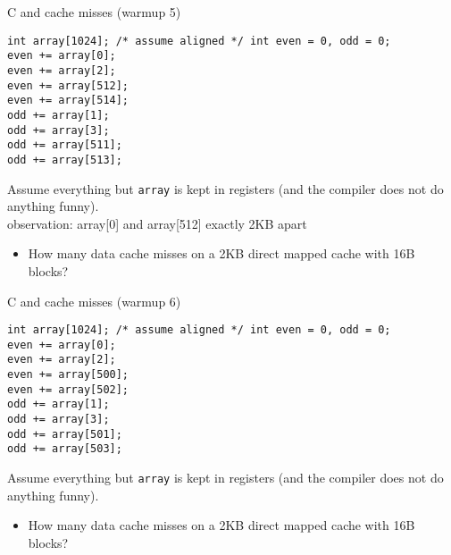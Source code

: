 \begin{frame}[fragile,label=arrayMissesWarmup5]{C and cache misses (warmup 5)}
\begin{lstlisting}[style=smaller]
int array[1024]; /* assume aligned */ int even = 0, odd = 0;
even += array[0];
even += array[2];
even += array[512];
even += array[514];
odd += array[1];
odd += array[3];
odd += array[511];
odd += array[513];
\end{lstlisting}
{\small
Assume everything but {\tt array} is kept in registers (and the compiler does not do
anything funny).\\
observation: array[0] and array[512] exactly 2KB apart}
\begin{itemize}
\item How many data cache misses on a 2KB direct mapped cache with 16B blocks?
\end{itemize}
\end{frame}

\begin{frame}[fragile,label=arrayMissesWarmup6]{C and cache misses (warmup 6)}
\begin{lstlisting}[style=smaller]
int array[1024]; /* assume aligned */ int even = 0, odd = 0;
even += array[0];
even += array[2];
even += array[500];
even += array[502];
odd += array[1];
odd += array[3];
odd += array[501];
odd += array[503];
\end{lstlisting}
{\small
Assume everything but {\tt array} is kept in registers (and the compiler does not do
anything funny).}
\begin{itemize}
\item How many data cache misses on a 2KB direct mapped cache with 16B blocks?
\end{itemize}
\end{frame}
